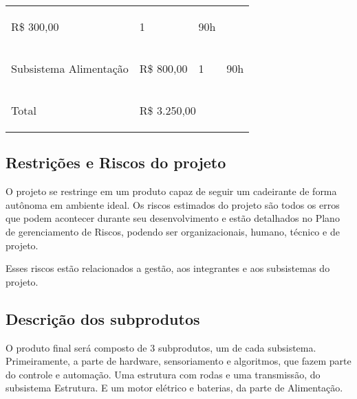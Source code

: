 \begin{apendicesenv}
\begin{table}[h]
{\begin{tabular}{ l l l l }
    \multicolumn{1}{p{2.367cm}|}{\begin{center}R\$ 300,00
\end{center}} &
    \multicolumn{1}{p{2.367cm}|}{\begin{center}1
\end{center}} &
    \multicolumn{1}{p{2.367cm}|}{\begin{center}90h
\end{center}}
  \\  
  \cline{1-1}\cline{2-2}\cline{3-3}\cline{4-4}  
    \multicolumn{1}{|p{2.367cm}|}{\begin{center}Subsistema Alimentação
\end{center}} &
    \multicolumn{1}{p{2.367cm}|}{\begin{center}R\$ 800,00
\end{center}} &
    \multicolumn{1}{p{2.367cm}|}{\begin{center}1
\end{center}} &
    \multicolumn{1}{p{2.367cm}|}{\begin{center}90h
\end{center}}
  \\  
  \cline{1-1}\cline{2-2}\cline{3-3}\cline{4-4}  
    \multicolumn{1}{|p{2.367cm}|}{\begin{center}Total
\end{center}} &
    \multicolumn{3}{p{7.100cm}|}{\begin{center}R\$ 3.250,00
\end{center}}
  \\  
  \hline

 \end{tabular} }
\end{table}

\subsection{Restrições e Riscos do projeto}

O projeto se restringe em um produto capaz de seguir um cadeirante de forma autônoma em ambiente ideal. Os riscos estimados do projeto são todos os erros que podem acontecer durante seu desenvolvimento e  estão detalhados no Plano de gerenciamento de Riscos, podendo ser organizacionais, humano, técnico e de projeto.

\par Esses riscos estão relacionados a gestão, aos integrantes e aos subsistemas do projeto.

\subsection{Descrição dos subprodutos}
O produto final será composto de 3 subprodutos, um de cada subsistema. Primeiramente, a parte de hardware, sensoriamento e algoritmos, que fazem parte do controle e automação. Uma estrutura com rodas e uma transmissão, do subsistema Estrutura. E um motor elétrico e baterias, da parte de Alimentação.


\end{apendicesenv}
